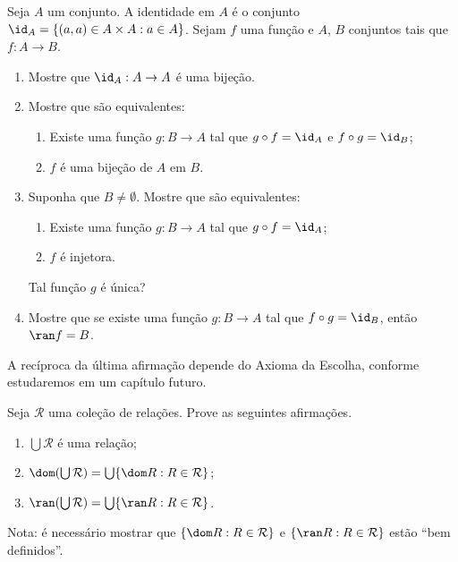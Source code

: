 \begin{exercise}[$\BST$]
    Seja $A$ um conjunto.
    A identidade em $A$ é o conjunto $\id_A = \{(a, a) \in A\times A : a \in A\}$.
    Sejam $f$ uma função e $A$, $B$ conjuntos tais que $f:A\to B$.
    \begin{enumerate}[label=(\alph*)]
        \item Mostre que $\id_A: A\to A$ é uma bijeção.
        \item Mostre que são equivalentes:
        \begin{enumerate}[label=(\roman*)]
            \item Existe uma função $g:B\to A$ tal que $g\circ f = \id_A$ e $f\circ g = \id_B$;
            \item $f$ é uma bijeção de $A$ em $B$.
        \end{enumerate}
        \item Suponha que $B\neq \emptyset$.
        Mostre que são equivalentes:
        \begin{enumerate}[label=(\roman*)]
            \item Existe uma função $g:B\to A$ tal que $g\circ f = \id_A$;
            \item $f$ é injetora.
        \end{enumerate}
        Tal função $g$ é única?
        \item Mostre que se existe uma função $g:B\to A$ tal que $f\circ g = \id_B$, então $\ran f=B$.
    \end{enumerate}
    A recíproca da última afirmação depende do Axioma da Escolha, conforme estudaremos em um capítulo futuro.
\end{exercise}

\begin{exercise}[$\ZmI$]
    Seja $\mathcal R$ uma coleção de relações.
    Prove as seguintes afirmações.
    \begin{enumerate}[label=(\alph*)]
        \item $\bigcup \mathcal R$ é uma relação;
        \item $\dom(\bigcup \mathcal R) = \bigcup\{\dom R : R \in \mathcal R\}$;
        \item $\ran(\bigcup \mathcal R) = \bigcup\{\ran R : R \in \mathcal R\}$.
    \end{enumerate}
    Nota: é necessário mostrar que $\{\dom R : R \in \mathcal R\}$ e $\{\ran R : R \in \mathcal R\}$ estão ``bem definidos''.
\end{exercise}

